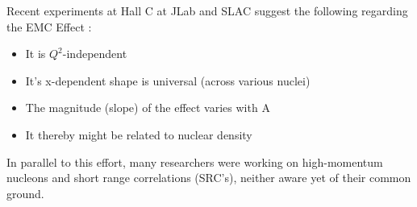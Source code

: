 Recent experiments at Hall C at JLab and SLAC suggest the following regarding the EMC Effect \cite{Seely:2009gt}:
\begin{itemize}
	\item
	It is $Q^2$-independent
	\item
	It's x-dependent shape is universal (across various nuclei)
	\item
	The magnitude (slope) of the effect varies with A
	\item
	It thereby might be related to nuclear density
\end{itemize}

In parallel to this effort, many researchers were working on high-momentum nucleons and short range correlations (SRC's), neither aware yet of their common ground.